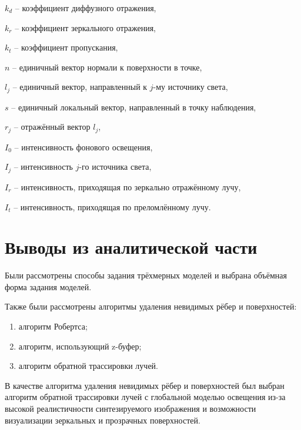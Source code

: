 $k_d$ -- коэффициент диффузного отражения,

$k_r$ -- коэффициент зеркального отражения,

$k_t$ -- коэффициент пропускания,

$n$ -- единичный вектор нормали к поверхности в точке,

$l_j$ -- единичный вектор, направленный к $j$-му источнику света,

$s$ -- единичный локальный вектор, направленный в точку наблюдения,

$r_j$ -- отражённый вектор $l_j$,

$I_0$ -- интенсивность фонового освещения,

$I_j$ -- интенсивность $j$-го источника света,

$I_r$ --  интенсивность, приходящая по зеркально отражённому лучу,

$I_t$ -- интенсивность, приходящая по преломлённому лучу.

\section{Выводы из аналитической части}
Были рассмотрены способы задания трёхмерных моделей и выбрана объёмная форма задания моделей.

Также были рассмотрены алгоритмы удаления невидимых рёбер и поверхностей:
\begin{enumerate}[label=\arabic*)]
	\item алгоритм Робертса;
	\item алгоритм, использующий z-буфер;
	\item алгоритм обратной трассировки лучей.
\end{enumerate}
В качестве  алгоритма удаления невидимых рёбер и поверхностей был выбран алгоритм обратной трассировки лучей с глобальной моделью освещения из-за высокой реалистичности синтезируемого изображения и возможности визуализации зеркальных и прозрачных поверхностей.
 
